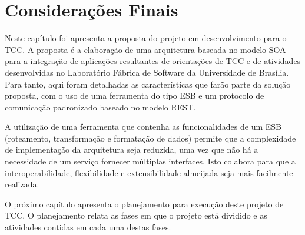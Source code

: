 \section{Considerações Finais}
Neste capítulo foi apresenta a proposta do projeto em desenvolvimento para o TCC. A proposta é a elaboração de uma arquitetura baseada no modelo SOA para a integração de aplicações resultantes de orientações de TCC e de atividades  desenvolvidas no Laboratório Fábrica de Software da Universidade de Brasília. Para tanto, aqui foram detalhadas as características que farão parte da solução proposta, com o uso de uma ferramenta do tipo ESB e um protocolo de comunicação padronizado baseado no modelo REST.

A utilização de uma ferramenta que contenha as funcionalidades de um ESB (roteamento, transformação e formatação de dados) permite que a complexidade de implementação da arquitetura seja reduzida, uma vez que não há a necessidade de um serviço fornecer múltiplas interfaces. Isto colabora para que a interoperabilidade, flexibilidade e extensibilidade almeijada seja mais facilmente realizada.

O próximo capítulo apresenta o planejamento para execução deste projeto de TCC. O planejamento relata as fases em que o projeto está dividido e as atividades contidas em cada uma destas fases. 
